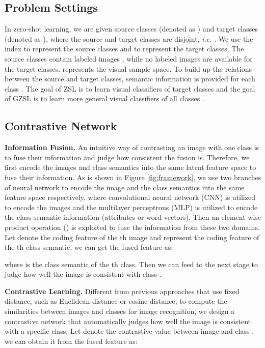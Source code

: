 \documentclass[10pt,twocolumn,letterpaper]{article}
\begin{document}
\subsection{Problem Settings}

In zero-shot learning, we are given  source classes (denoted as ) and  target classes (denoted as ), where the source and target classes are disjoint, \emph{i.e.} . We use the index  to represent the source classes and  to represent the target classes. The source classes contain  labeled images , while no labeled images are available for the target classes.  represents the visual sample space. To build up the relations between the source and target classes, semantic information  is provided for each class . The goal of ZSL is to learn visual classifiers of target classes  and the goal of GZSL is to learn more general visual classifiers of all classes .

\subsection{Contrastive Network}

\textbf{Information Fusion.} An intuitive way of contrasting an image with one class is to fuse their information and judge how consistent the fusion is. Therefore, we first encode the images and class semantics into the same latent feature space to fuse their information. As is shown in Figure \ref{fig:framework}, we use two branches of neural network to encode the image and the class semantics into the same feature space respectively, where convolutional neural network (CNN) is utilized to encode the images and the multilayer perceptrons (MLP) is utilized to encode the class semantic information (attributes or word vectors). Then an element-wise product operation () is exploited to fuse the information from these two domains. Let  denote the coding feature of the th image and  represent the coding feature of the th class semantic, we can get the fused feature  as:

where  is the class semantic of the th class. Then we can feed  to the next stage to judge how well the image  is consistent with class .

\textbf{Contrastive Learning.} Different from previous approaches that use fixed distance, such as Euclidean distance or cosine distance, to compute the similarities between images and classes for image recognition, we design a contrastive network that automatically judges how well the image is consistent with a specific class. Let  denote the contrastive value between image  and class , we can obtain it from the fused feature  as:
\end{document}
